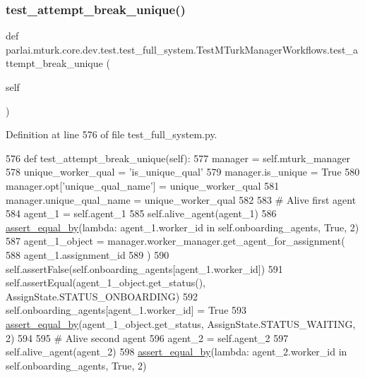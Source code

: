 \subsubsection{\texorpdfstring{test\+\_\+attempt\+\_\+break\+\_\+unique()}{test\_attempt\_break\_unique()}}
{\footnotesize\ttfamily def parlai.\+mturk.\+core.\+dev.\+test.\+test\+\_\+full\+\_\+system.\+Test\+M\+Turk\+Manager\+Workflows.\+test\+\_\+attempt\+\_\+break\+\_\+unique (\begin{DoxyParamCaption}\item[{}]{self }\end{DoxyParamCaption})}



Definition at line 576 of file test\+\_\+full\+\_\+system.\+py.


\begin{DoxyCode}
576     \textcolor{keyword}{def }test\_attempt\_break\_unique(self):
577         manager = self.mturk\_manager
578         unique\_worker\_qual = \textcolor{stringliteral}{'is\_unique\_qual'}
579         manager.is\_unique = \textcolor{keyword}{True}
580         manager.opt[\textcolor{stringliteral}{'unique\_qual\_name'}] = unique\_worker\_qual
581         manager.unique\_qual\_name = unique\_worker\_qual
582 
583         \textcolor{comment}{# Alive first agent}
584         agent\_1 = self.agent\_1
585         self.alive\_agent(agent\_1)
586         \hyperlink{namespaceparlai_1_1mturk_1_1core_1_1test_1_1test__full__system_a0b463246d35658a2e422010f13dcf819}{assert\_equal\_by}(\textcolor{keyword}{lambda}: agent\_1.worker\_id \textcolor{keywordflow}{in} self.onboarding\_agents, \textcolor{keyword}{True}, 2)
587         agent\_1\_object = manager.worker\_manager.get\_agent\_for\_assignment(
588             agent\_1.assignment\_id
589         )
590         self.assertFalse(self.onboarding\_agents[agent\_1.worker\_id])
591         self.assertEqual(agent\_1\_object.get\_status(), AssignState.STATUS\_ONBOARDING)
592         self.onboarding\_agents[agent\_1.worker\_id] = \textcolor{keyword}{True}
593         \hyperlink{namespaceparlai_1_1mturk_1_1core_1_1test_1_1test__full__system_a0b463246d35658a2e422010f13dcf819}{assert\_equal\_by}(agent\_1\_object.get\_status, AssignState.STATUS\_WAITING, 2)
594 
595         \textcolor{comment}{# Alive second agent}
596         agent\_2 = self.agent\_2
597         self.alive\_agent(agent\_2)
598         \hyperlink{namespaceparlai_1_1mturk_1_1core_1_1test_1_1test__full__system_a0b463246d35658a2e422010f13dcf819}{assert\_equal\_by}(\textcolor{keyword}{lambda}: agent\_2.worker\_id \textcolor{keywordflow}{in} self.onboarding\_agents, \textcolor{keyword}{True}, 2)

\end{DoxyCode}
